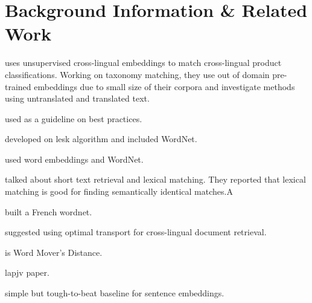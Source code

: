 
\chapter{Background Information \& Related Work}\label{chap:background_n_related}

\textcite{gordeev_unsupervised_2018} uses unsupervised cross-lingual embeddings to match cross-lingual product classifications.
Working on taxonomy matching, they use out of domain pre-trained embeddings due to small size of their corpora and investigate methods using untranslated and translated text.

\textcite{irvine_comprehensive_2017} used as a guideline on best practices.

\textcite{banerjee_adapted_2002} developed on lesk algorithm and included WordNet.


\textcite{khodak_automated_2017} used word embeddings and WordNet.

\textcite{metzler_similarity_2007} talked about short text retrieval and lexical matching. They reported that lexical matching is good for finding semantically identical matches.A

\textcite{sagot_building_2008} built a French wordnet.

\textcite{balikas_cross-lingual_2018} suggested using optimal transport for cross-lingual document retrieval.

\textcite{kusner_word_2015} is Word Mover's Distance.

\textcite{jonker_shortest_1987} lapjv paper.

\textcite{arora_simple_2016} simple but tough-to-beat baseline for sentence embeddings.
